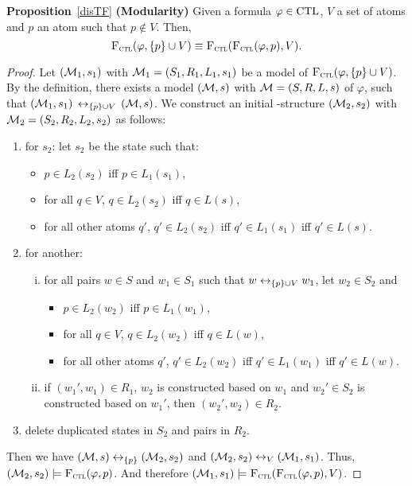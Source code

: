 \documentclass{article}
\begin{document}
 \noindent\textbf{Proposition}~\ref{disTF} \textbf{(Modularity)} Given a formula $\varphi \in \textrm{CTL}$, $V$ a set of atoms and $p$ an atom such that $p \notin V$. Then,
 \[
 {\textsc{F}_{\textsc{ctl}}}(\varphi, \{p\} \cup V) \equiv {\textsc{F}_{\textsc{ctl}}}({\textsc{F}_{\textsc{ctl}}}(\varphi, p), V).
 \]
 \begin{proof}
 Let $({\cal M}_1, s_1) $ with ${\cal M}_1=(S_1, R_1, L_1,s_1)$ be a model of ${\textsc{F}_{\textsc{ctl}}}(\varphi, \{p\} \cup V)$. By the definition, there exists a model $({\cal M},s)$ with ${\cal M} = (S, R,L,s)$ of $\varphi$, such that $({\cal M}_1, s_1)$ $\leftrightarrow_{\{p\} \cup V}$ $({\cal M}, s)$. We construct an initial \MPK-structure $({\cal M}_2, s_2)$ with ${\cal M}_2 = (S_2, R_2, L_2,s_2)$ as follows:
 \begin{enumerate}[(1)]
   \item for $s_2$: let $s_2$ be the state such that:
   \begin{itemize}
     \item $p \in L_2(s_2)$ iff $p \in L_1(s_1)$,
     \item for all $q \in V$, $q \in L_2(s_2)$ iff $q\in L(s)$,
     \item for all other atoms $q'$, $q' \in L_2(s_2)$ iff $q' \in L_1(s_1)$ iff $q'\in L(s)$.
   \end{itemize}
   \item for another:
   \begin{enumerate}[(i)]
     \item for all pairs  $w \in S$ and $w_1 \in S_1$ such that $w \leftrightarrow_{\{p\} \cup V} w_1$, let $w_2 \in S_2$ and
         \begin{itemize}
           \item $p \in L_2(w_2)$ iff $p \in L_1(w_1)$,
           \item for all $q \in V$, $q \in L_2(w_2)$ iff $q\in L(w)$,
           \item for all other atoms $q'$, $q' \in L_2(w_2)$ iff $q' \in L_1(w_1)$ iff $q'\in L(w)$.
         \end{itemize}
     \item if $(w_1', w_1)\in R_1$, $w_2$ is constructed based on $w_1$ and $w_2'\in S_2$ is constructed based on $w_1'$, then $(w_2', w_2)\in R_2$.
   \end{enumerate}
   \item delete duplicated states in $S_2$ and pairs in $R_2$.
 \end{enumerate}
 Then we have $({\cal M}, s) \leftrightarrow_{\{p\}} ({\cal M}_2, s_2)$ and $({\cal M}_2, s_2) \leftrightarrow_V ({\cal M}_1, s_1)$. Thus, $({\cal M}_2, s_2) \models {\textsc{F}_{\textsc{ctl}}}(\varphi, p)$. And therefore $({\cal M}_1, s_1) \models {\textsc{F}_{\textsc{ctl}}}({\textsc{F}_{\textsc{ctl}}}(\varphi, p), V)$.


\end{proof}
\end{document}
